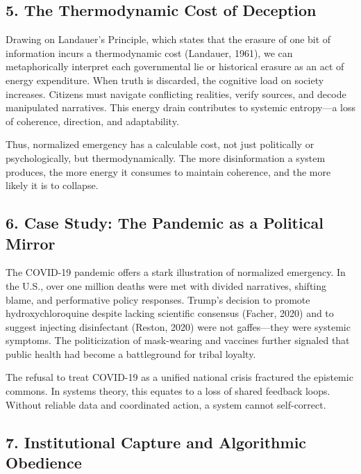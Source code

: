 \documentclass[
]{article}
\begin{document}
\subsection{5. The Thermodynamic Cost of Deception}\label{the-thermodynamic-cost-of-deception}

Drawing on Landauer's Principle, which states that the erasure of one bit of information incurs a thermodynamic cost (Landauer, 1961), we can metaphorically interpret each governmental lie or historical erasure as an act of energy expenditure. When truth is discarded, the cognitive load on society increases. Citizens must navigate conflicting realities, verify sources, and decode manipulated narratives. This energy drain contributes to systemic entropy---a loss of coherence, direction, and adaptability.

Thus, normalized emergency has a calculable cost, not just politically or psychologically, but thermodynamically. The more disinformation a system produces, the more energy it consumes to maintain coherence, and the more likely it is to collapse.

\subsection{6. Case Study: The Pandemic as a Political Mirror}\label{case-study-the-pandemic-as-a-political-mirror}

The COVID-19 pandemic offers a stark illustration of normalized emergency. In the U.S., over one million deaths were met with divided narratives, shifting blame, and performative policy responses. Trump's decision to promote hydroxychloroquine despite lacking scientific consensus (Facher, 2020) and to suggest injecting disinfectant (Reston, 2020) were not gaffes---they were systemic symptoms. The politicization of mask-wearing and vaccines further signaled that public health had become a battleground for tribal loyalty.

The refusal to treat COVID-19 as a unified national crisis fractured the epistemic commons. In systems theory, this equates to a loss of shared feedback loops. Without reliable data and coordinated action, a system cannot self-correct.

\subsection{7. Institutional Capture and Algorithmic Obedience}\label{institutional-capture-and-algorithmic-obedience}
\end{document}
